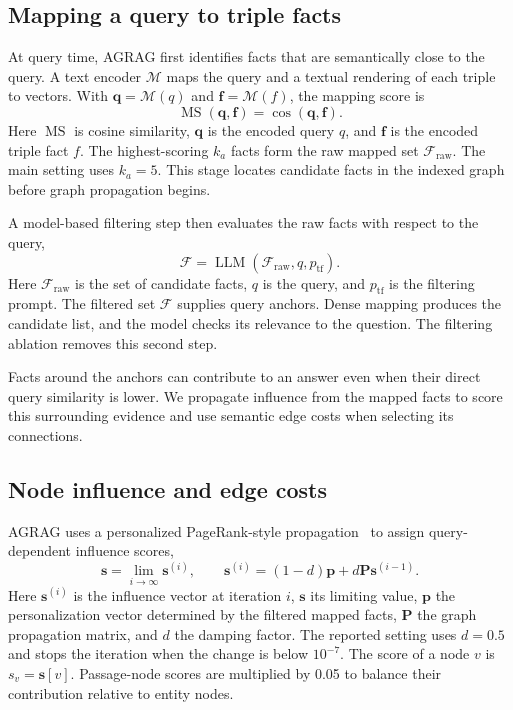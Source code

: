 \subsection{Mapping a query to triple facts}
At query time, AGRAG first identifies facts that are semantically close to the query. A text encoder $\mathcal{M}$ maps the query and a textual rendering of each triple to vectors. With $\mathbf{q}=\mathcal{M}(q)$ and $\mathbf{f}=\mathcal{M}(f)$, the mapping score is
\begin{equation}
\operatorname{MS}(\mathbf{q},\mathbf{f})=
\cos(\mathbf{q},\mathbf{f}).
\label{eq:agrag:mapping}
\end{equation}
Here $\operatorname{MS}$ is cosine similarity, $\mathbf q$ is the encoded query $q$, and $\mathbf f$ is the encoded triple fact $f$. The highest-scoring $k_a$ facts form the raw mapped set $\mathcal{F}_{\mathrm{raw}}$. The main setting uses $k_a=5$. This stage locates candidate facts in the indexed graph before graph propagation begins.

A model-based filtering step then evaluates the raw facts with respect to the query,
\begin{equation}
\mathcal{F}=\operatorname{LLM}(\mathcal{F}_{\mathrm{raw}},q,p_{\mathrm{tf}}).
\label{eq:agrag:filter}
\end{equation}
Here $\mathcal F_{\mathrm{raw}}$ is the set of candidate facts, $q$ is the query, and $p_{\mathrm{tf}}$ is the filtering prompt. The filtered set $\mathcal{F}$ supplies query anchors. Dense mapping produces the candidate list, and the model checks its relevance to the question. The filtering ablation removes this second step.

Facts around the anchors can contribute to an answer even when their direct query similarity is lower. We propagate influence from the mapped facts to score this surrounding evidence and use semantic edge costs when selecting its connections.

\subsection{Node influence and edge costs}
AGRAG uses a personalized PageRank-style propagation~\cite{agrag-haveliwala2002topic} to assign query-dependent influence scores,
\begin{equation}
\mathbf{s}=\lim_{i\rightarrow\infty}\mathbf{s}^{(i)},\qquad
\mathbf{s}^{(i)}=(1-d)\mathbf{p}+d\mathbf{P}\mathbf{s}^{(i-1)}.
\label{eq:agrag:propagation}
\end{equation}
Here $\mathbf s^{(i)}$ is the influence vector at iteration $i$, $\mathbf s$ its limiting value, $\mathbf p$ the personalization vector determined by the filtered mapped facts, $\mathbf P$ the graph propagation matrix, and $d$ the damping factor. The reported setting uses $d=0.5$ and stops the iteration when the change is below $10^{-7}$. The score of a node $v$ is $s_v=\mathbf{s}[v]$. Passage-node scores are multiplied by 0.05 to balance their contribution relative to entity nodes.

